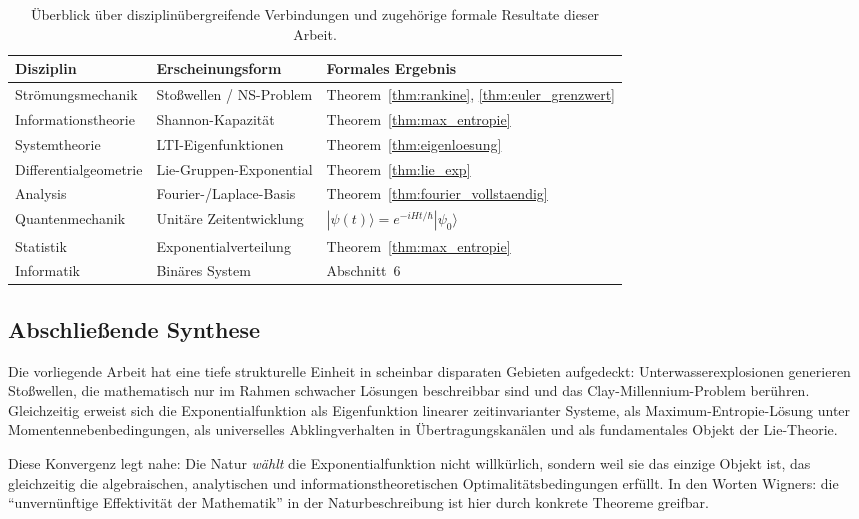 ﻿\documentclass[12pt,a4paper]{article}
\theoremstyle{definition}
\theoremstyle{remark}
\begin{document}
\begin{table}[H]
\centering
\begin{tabular}{@{}lll@{}}
\toprule
\textbf{Disziplin} & \textbf{Erscheinungsform} & \textbf{Formales Ergebnis} \\
\midrule
Strömungsmechanik & Stoßwellen / NS-Problem & Theorem~\ref{thm:rankine}, \ref{thm:euler_grenzwert} \\
Informationstheorie & Shannon-Kapazität & Theorem~\ref{thm:max_entropie} \\
Systemtheorie & LTI-Eigenfunktionen & Theorem~\ref{thm:eigenloesung} \\
Differentialgeometrie & Lie-Gruppen-Exponential & Theorem~\ref{thm:lie_exp} \\
Analysis & Fourier-/Laplace-Basis & Theorem~\ref{thm:fourier_vollstaendig} \\
Quantenmechanik & Unitäre Zeitentwicklung & $|\psi(t)\rangle = e^{-iHt/\hbar}|\psi_0\rangle$ \\
Statistik & Exponentialverteilung & Theorem~\ref{thm:max_entropie} \\
Informatik & Binäres System & Abschnitt~6 \\
\bottomrule
\end{tabular}
\caption{Überblick über disziplinübergreifende Verbindungen und zugehörige formale Resultate dieser Arbeit.}
\end{table}

\subsection{Abschließende Synthese}

Die vorliegende Arbeit hat eine tiefe strukturelle Einheit in scheinbar disparaten Gebieten aufgedeckt: Unterwasserexplosionen generieren Stoßwellen, die mathematisch nur im Rahmen schwacher Lösungen beschreibbar sind und das Clay-Millennium-Problem berühren. Gleichzeitig erweist sich die Exponentialfunktion als Eigenfunktion linearer zeitinvarianter Systeme, als Maximum-Entropie-Lösung unter Momentennebenbedingungen, als universelles Abklingverhalten in Übertragungskanälen und als fundamentales Objekt der Lie-Theorie.

Diese Konvergenz legt nahe: Die Natur \emph{wählt} die Exponentialfunktion nicht willkürlich, sondern weil sie das einzige Objekt ist, das gleichzeitig die algebraischen, analytischen und informationstheoretischen Optimalitätsbedingungen erfüllt. In den Worten Wigners: die ``unvernünftige Effektivität der Mathematik'' in der Naturbeschreibung ist hier durch konkrete Theoreme greifbar.
\end{document}
